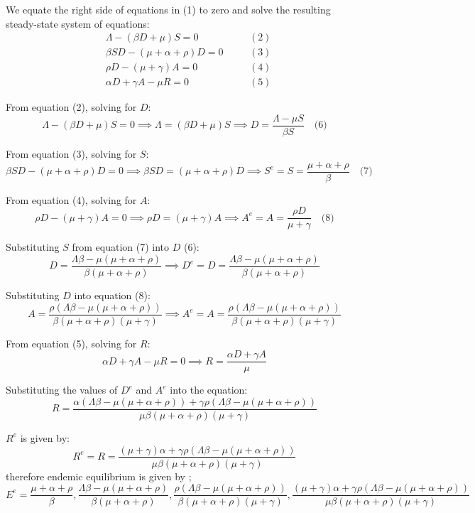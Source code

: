 \documentclass[12pt]{report}
\begin{document}
We equate the right side of equations in (1) to zero and solve the resulting steady-state system of equations:
\[
\begin{aligned}
	&\Lambda - (\beta D + \mu)S = 0         & \quad &(2) \\
	&\beta SD - (\mu + \alpha + \rho)D = 0 &       &(3) \\
	&\rho D - (\mu + \gamma)A = 0          &       &(4) \\
	&\alpha D + \gamma A - \mu R = 0       &       &(5)
\end{aligned}
\]

From equation (2), solving for \( D \):
\[
\Lambda - (\beta D + \mu)S = 0 \implies \Lambda = (\beta D + \mu)S \implies D = \frac{\Lambda - \mu S}{\beta S} \quad \text{(6)}
\]

From equation (3), solving for \( S \):
\[
\beta SD - (\mu + \alpha + \rho)D = 0 \implies \beta S D = (\mu + \alpha + \rho)D \implies S^e = S = \frac{\mu + \alpha + \rho}{\beta} \quad \text{(7)}
\]

From equation (4), solving for \( A \):
\[
\rho D - (\mu + \gamma)A = 0 \implies \rho D = (\mu + \gamma)A \implies A^e = A = \frac{\rho D}{\mu + \gamma} \quad \text{(8)}
\]

Substituting \( S \) from equation (7) into \( D \) (6):
\[
D = \frac{\Lambda \beta - \mu(\mu + \alpha + \rho)}{\beta(\mu + \alpha + \rho)} \implies D^e = D = \frac{\Lambda \beta - \mu(\mu + \alpha + \rho)}{\beta(\mu + \alpha + \rho)}
\]

Substituting \( D \) into equation (8):
\[
A = \frac{\rho (\Lambda \beta - \mu(\mu + \alpha + \rho))}{\beta(\mu + \alpha + \rho)(\mu + \gamma)} \implies A^e = A = \frac{\rho (\Lambda \beta - \mu(\mu + \alpha + \rho))}{\beta(\mu + \alpha + \rho)(\mu + \gamma)}
\]

From equation (5), solving for \( R \):
\[
\alpha D + \gamma A - \mu R = 0 \implies R = \frac{\alpha D + \gamma A}{\mu}
\]

Substituting the values of \( D^e \) and \( A^e \) into the equation:
\[
R = \frac{\alpha \left( \Lambda \beta - \mu(\mu + \alpha + \rho) \right) + \gamma \rho \left( \Lambda \beta - \mu(\mu + \alpha + \rho) \right)}{\mu \beta (\mu + \alpha + \rho)(\mu + \gamma)}
\]

 \( R^e \) is given by:
\[
R^e = R = \frac{(\mu + \gamma)\alpha + \gamma \rho( \Lambda \beta - \mu(\mu + \alpha + \rho))}{\mu \beta (\mu + \alpha + \rho)(\mu + \gamma)} 
\]
therefore endemic equilibrium is given by ;\[E^e=\frac{\mu + \alpha + \rho}{\beta} ,\frac{\Lambda \beta - \mu(\mu + \alpha + \rho)}{\beta(\mu + \alpha + \rho)},\frac{\rho (\Lambda \beta - \mu(\mu + \alpha + \rho))}{\beta(\mu + \alpha + \rho)(\mu + \gamma)},\frac{(\mu + \gamma)\alpha + \gamma \rho( \Lambda \beta - \mu(\mu + \alpha + \rho))}{\mu \beta (\mu + \alpha + \rho)(\mu + \gamma)} \]
\end{document}
